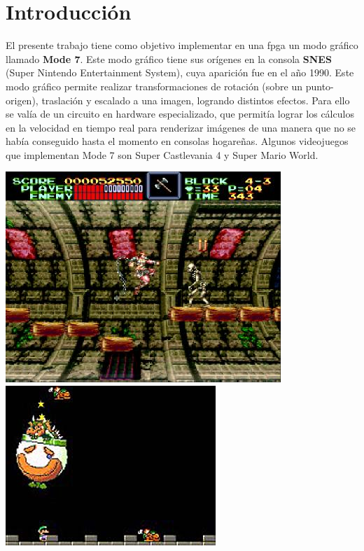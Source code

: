 \section{Introducción}
El presente trabajo tiene como objetivo implementar en una fpga un modo gráfico llamado \textbf{Mode 7}. Este modo gráfico tiene sus orígenes en la consola \textbf{SNES} (Super Nintendo Entertainment System), cuya aparición fue en el año 1990. Este modo gráfico permite realizar transformaciones de rotación (sobre un punto-origen), traslación y escalado a una imagen, logrando distintos efectos. Para ello se valía de un circuito en hardware especializado, que permitía lograr los cálculos en la velocidad en tiempo real para renderizar imágenes de una manera que no se había conseguido hasta el momento en consolas hogareñas. Algunos videojuegos que implementan Mode 7 son Super Castlevania 4 y Super Mario World.

\begin{center}
{
\includegraphics[scale=0.5]{castlevania.jpg}
\includegraphics[scale=0.5]{mario.jpg}
}
\end{center}   
